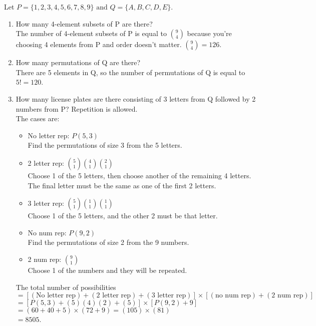 \documentclass[12pt]{article}
\newcommand{\be}{\begin{enumerate}}
\newcommand{\ee}{\end{enumerate}}
\newcommand{\tand}{\text{ and }}
\begin{document}
\item Let $P=\{1,2,3,4,5,6,7,8,9\}\tand Q=\{A,B,C,D,E\}$.
	\be
	\item How many 4-element subsets of P are there?\\
	The number of 4-element subsets of P is equal to ${9\choose4}$ because you're choosing 4 elements from P and order doesn't 
	matter. ${9\choose4}=126$.
	\item How many permutations of Q are there?\\
	There are 5 elements in Q, so the number of permutations of Q is equal to $5!=120$. 
	\item How many license plates are there consisting of 3 letters from Q followed by 2 numbers from P? Repetition is allowed.\\
	The cases are:
		\begin{itemize}
		\item No letter rep: $P(5,3)$ \\
			Find the permutations of size 3 from the 5 letters.
		\item 2 letter rep: ${5\choose1}{4\choose1}{2\choose1}$ \\
			Choose 1 of the 5 letters, then choose another of the remaining 4 letters. The final letter must be the same as one
			of the first 2 letters.
		\item 3 letter rep: ${5\choose1}{1\choose1}{1\choose1}$\\	
			Choose 1 of the 5 letters, and the other 2 must be that letter.
		\item No num rep: $P(9,2)$\\
			Find the permutations of size 2 from the 9 numbers.
		\item 2 num rep: $9\choose1$\\
			Choose 1 of the numbers and they will be repeated.
		\end{itemize}
		The total number of possibilities\\
		$=[(\text{No letter rep})+(\text{2 letter rep})+(\text{3 letter rep})]\times[(\text{no num rep})+(\text{2 num rep})]$ \\
		$=[P(5,3)+(5)(4)(2)+(5)]\times[P(9,2)+9]$\\
		$=(60+40+5)\times(72+9)=(105)\times(81)$\\
		$=8505$.
	\ee
\end{document}
